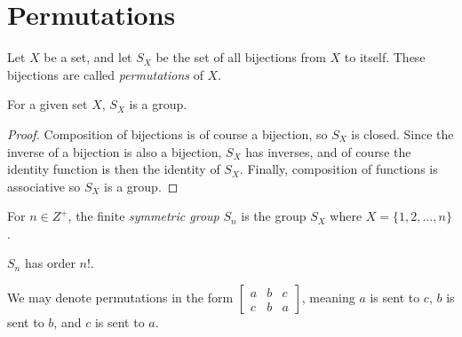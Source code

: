 \section{Permutations}

\begin{defn}
    Let $X$ be a set, and let $S_X$ be the set of all bijections from $X$ to itself. These bijections are called \emph{permutations} of $X$.
\end{defn}

\begin{prop}\label{permutations-group}
    For a given set $X$, $S_X$ is a group.
\end{prop}

\begin{proof}
    Composition of bijections is of course a bijection, so $S_X$ is closed. Since the inverse of a bijection is also a bijection, $S_X$ has inverses, and of course the identity function is then the identity of $S_X$. Finally, composition of functions is associative so $S_X$ is a group.
\end{proof}

\begin{defn}
    For $n \in Z^+$, the finite \emph{symmetric group} $S_n$ is the group $S_X$ where $X = \{1, 2, \ldots, n\}$.
\end{defn}

\begin{rmk}
    $S_n$ has order $n!$.
\end{rmk}

\begin{rmk}
    We may denote permutations in the form
    $\begin{bmatrix}
        a & b & c \\ c & b & a
    \end{bmatrix}$, meaning $a$ is sent to $c$, $b$ is sent to $b$, and $c$ is sent to $a$.
\end{rmk}

